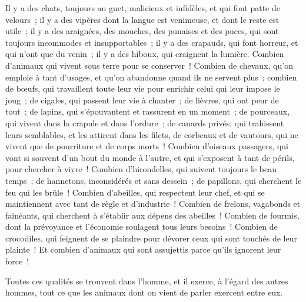 \documentclass[french,twoside]{book} %
\begin{document}
Il y a des chats, toujours au guet, malicieux et infidèles, et qui font patte de velours ; il y a des vipères dont la langue est venimeuse, et dont le reste est utile ; il y a des araignées, des mouches, des punaises et des puces, qui sont toujours incommodes et insupportables ; il y a des crapauds, qui font horreur, et qui n’ont que du venin ; il y a des hiboux, qui craignent la lumière. Combien d’animaux qui vivent sous terre pour se conserver ! Combien de chevaux, qu’on emploie à tant d’usages, et qu’on abandonne quand ils ne servent plus ; combien de bœufs, qui travaillent toute leur vie pour enrichir celui qui leur impose le joug ; de cigales, qui passent leur vie à chanter ; de lièvres, qui ont peur de tout ; de lapins, qui s’épouvantent et rassurent en un moment ; de pourceaux, qui vivent dans la crapule et dans l’ordure ; de canards privés, qui trahissent leurs semblables, et les attirent dans les filets, de corbeaux et de vautours, qui ne vivent que de pourriture et de corps morts ! Combien d’oiseaux passagers, qui vont si souvent d’un bout du monde à l’autre, et qui s’exposent à tant de périls, pour chercher à vivre ! Combien d’hirondelles, qui suivent toujours le beau temps ; de hannetons, inconsidérés et sans dessein ; de papillons, qui cherchent le feu qui les brûle ! Combien d’abeilles, qui respectent leur chef, et qui se maintiennent avec tant de règle et d’industrie ! Combien de frelons, vagabonds et fainéants, qui cherchent à s’établir aux dépens des abeilles ! Combien de fourmis, dont la prévoyance et l’économie soulagent tous leurs besoins ! Combien de crocodiles, qui feignent de se plaindre pour dévorer ceux qui sont touchés de leur plainte ! Et combien d’animaux qui sont assujettis parce qu’ils ignorent leur force !\par
Toutes ces qualités se trouvent dans l’homme, et il exerce, à l’égard des autres hommes, tout ce que les animaux dont on vient de parler exercent entre eux.
\end{document}
